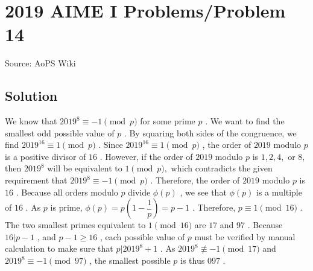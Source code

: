 \documentclass[12pt]{article}
\begin{document}
\section*{{2019 AIME I Problems/Problem 14}}
Source: AoPS Wiki

\subsection*{Solution}
We know that $2019^8 \equiv -1 \pmod{p}$ for some prime $p$ . We want to find the smallest odd possible value of $p$ . By squaring both sides of the congruence, we find $2019^{16} \equiv 1 \pmod{p}$ . Since $2019^{16} \equiv 1 \pmod{p}$ , the order of $2019$ modulo $p$ is a positive divisor of $16$ . However, if the order of $2019$ modulo $p$ is $1, 2, 4,$ or $8,$ then $2019^8$ will be equivalent to $1 \pmod{p},$ which contradicts the given requirement that $2019^8\equiv -1\pmod{p}$ . Therefore, the order of $2019$ modulo $p$ is $16$ . Because all orders modulo $p$ divide $\phi(p)$ , we see that $\phi(p)$ is a multiple of $16$ . As $p$ is prime, $\phi(p) = p\left(1 - \dfrac{1}{p}\right) = p - 1$ . Therefore, $p\equiv 1 \pmod{16}$ . The two smallest primes equivalent to $1 \pmod{16}$ are $17$ and $97$ . Because $16 | p - 1$ , and $p - 1 \geq 16$ , each possible value of $p$ must be verified by manual calculation to make sure that $p | 2019^8+1$ . As $2019^8 \not\equiv -1 \pmod{17}$ and $2019^8 \equiv -1 \pmod{97}$ , the smallest possible $p$ is thus $\boxed{097}$ .
\end{document}
